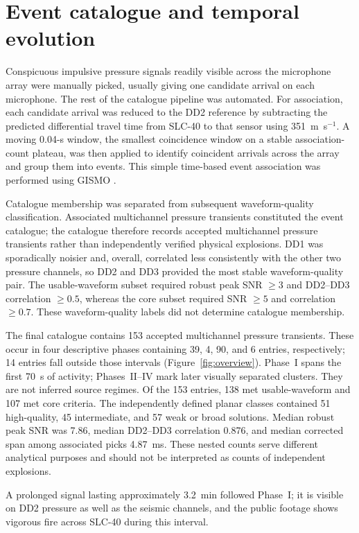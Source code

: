 \documentclass[]{seismica}
\begin{document}
\section{Event catalogue and temporal evolution}
\label{sec:temporal_evolution}

Conspicuous impulsive pressure signals readily visible across the microphone
array were manually picked, usually giving one candidate arrival on each
microphone. The rest of the catalogue pipeline was automated. For association,
each candidate arrival was reduced to the DD2 reference by subtracting the
predicted differential travel time from SLC-40 to that sensor using
351~m~s$^{-1}$. A moving 0.04-s window, the smallest coincidence window on a
stable association-count plateau, was then applied to identify coincident
arrivals across the array and group them into events. This simple time-based
event association was performed using GISMO \citep{thompson_gismo_2017}.

Catalogue membership was separated from subsequent waveform-quality
classification. Associated multichannel pressure transients constituted the
event catalogue; the catalogue therefore records accepted multichannel
pressure transients rather than independently verified physical explosions.
DD1 was sporadically noisier and, overall, correlated less consistently with
the other two pressure channels, so DD2 and DD3 provided the most stable
waveform-quality pair. The usable-waveform subset required robust peak
SNR $\geq3$ and DD2--DD3 correlation $\geq0.5$, whereas the core subset
required SNR $\geq5$ and correlation $\geq0.7$. These waveform-quality labels
did not determine catalogue membership.

The final catalogue contains 153 accepted multichannel pressure transients.
These occur in four descriptive phases containing 39, 4, 90, and 6 entries,
respectively; 14 entries fall outside those intervals
(Figure~\ref{fig:overview}). Phase~I spans the first 70~s of activity;
Phases~II--IV mark later visually separated clusters. They are not inferred
source regimes. Of the 153 entries, 138 met usable-waveform and 107 met core
criteria. The independently defined planar classes contained 51 high-quality,
45 intermediate, and 57 weak or broad solutions. Median robust peak SNR was
7.86, median DD2--DD3 correlation 0.876, and median corrected span among
associated picks 4.87~ms. These nested counts serve different analytical
purposes and should not be interpreted as counts of independent explosions.

A prolonged signal lasting approximately 3.2~min followed Phase~I; it is
visible on DD2 pressure as well as the seismic channels, and the public footage
shows vigorous fire across SLC-40 during this interval.
\end{document}
